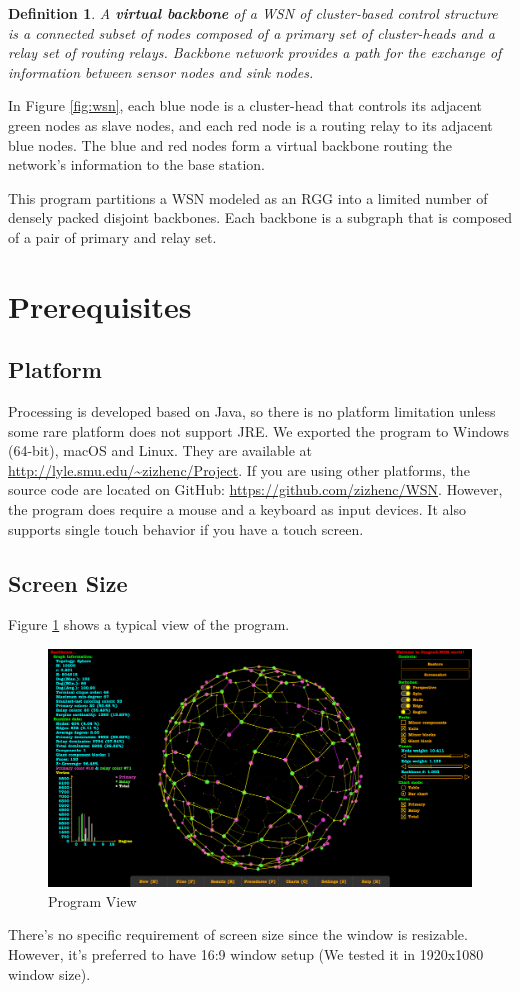 \documentclass[11pt]{amsart}
\newtheorem{definition}{Definition}
\begin{document}
\begin{definition}
	A \textbf{virtual backbone} of a \ac{WSN} of cluster-based control structure is a connected subset of nodes composed of a primary set of cluster-heads and a relay set of routing relays. Backbone network provides a path for the exchange of information between sensor nodes and sink nodes.
\end{definition}
In Figure \ref{fig:wsn}, each blue node is a cluster-head that controls its adjacent green nodes as slave nodes, and each red node is a routing relay to its adjacent blue nodes. The blue and red nodes form a virtual backbone routing the network’s information to the base station.

This program partitions a \ac{WSN} modeled as an \ac{RGG} into a limited number of densely packed disjoint backbones. Each backbone is a subgraph that is composed of a pair of primary and relay set.
\section{Prerequisites}
\subsection{Platform}
Processing is developed based on Java, so there is no platform limitation unless some rare platform does not support \ac{JRE}. We exported the program to Windows (64-bit), macOS and Linux. They are available at \url{http://lyle.smu.edu/~zizhenc/Project}. If you are using other platforms, the source code are located on GitHub: \url{https://github.com/zizhenc/WSN}. However, the program does require a mouse and a keyboard as input devices. It also supports single touch behavior if you have a touch screen.
\subsection{Screen Size}
Figure \ref{fig:view} shows a typical view of the program. 
 \begin{figure}[htp]
	\centering
	\includegraphics[width=\linewidth]{images/View.png}
	\caption{Program View}
	\label{fig:view}
\end{figure}
There's no specific requirement of screen size since the window is resizable. However, it's preferred to have 16:9 window setup (We tested it in 1920x1080 window size).
\end{document}

